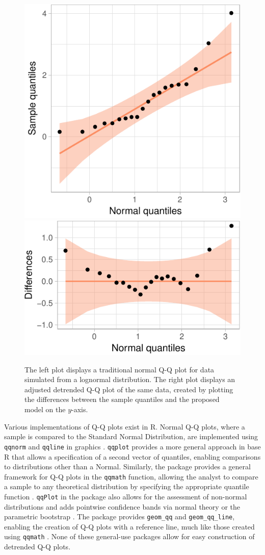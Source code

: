 \begin{Schunk}
\begin{figure}

{\centering \includegraphics[width=.4\linewidth]{loy-figures/ex-detrend-1} \includegraphics[width=.4\linewidth]{loy-figures/ex-detrend-2} 

}

\caption[The left plot displays a traditional normal Q-Q plot for data simulated from a lognormal distribution]{The left plot displays a traditional normal Q-Q plot for data simulated from a lognormal distribution. The right plot displays an adjusted detrended Q-Q plot of the same data, created by plotting the differences between the sample quantiles and the proposed model on the $y$-axis.}\label{fig:ex-detrend}
\end{figure}
\end{Schunk}

Various implementations of Q-Q plots exist in R. Normal Q-Q plots, where
a sample is compared to the Standard Normal Distribution, are
implemented using \texttt{qqnorm} and \texttt{qqline} in 
graphics \citep{R}. \texttt{qqplot} provides a more general approach in
base R that allows a specification of a second vector of quantiles,
enabling comparisons to distributions other than a Normal. Similarly,
the  package provides a general framework for Q-Q plots in
the \texttt{qqmath} function, allowing the analyst to compare a sample
to any theoretical distribution by specifying the appropriate quantile
function \citep{lattice}. \texttt{qqPlot} in the  package also
allows for the assessment of non-normal distributions and adds pointwise
confidence bands via normal theory or the parametric bootstrap
\citep{car}. The  package provides \texttt{geom\_qq} and
\texttt{geom\_qq\_line}, enabling the creation of Q-Q plots with a
reference line, much like those created using \texttt{qqmath}
\citep{ggplot2}. None of these general-use packages allow for easy
construction of detrended Q-Q plots.

